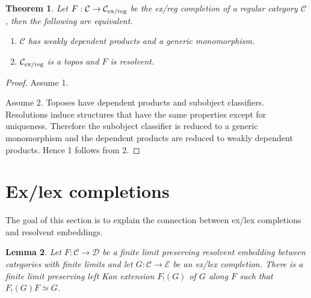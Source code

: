 \documentclass[sort&compress,draft]{elsarticle}
\theoremstyle{plain}
\newtheorem{theorem}{Theorem}
\newtheorem{lemma}[theorem]{Lemma}
\theoremstyle{definition}
\theoremstyle{remark}
\newcommand\hide[1]{}
\newcommand\cat\mathcal
\newcommand\of:
\newcommand\di{_!}
\begin{document}
\begin{theorem} Let $F:\cat C\to\cat C\exreg$ be the ex/reg completion of a regular category $\cat C$, then the following are equivalent.
\begin{enumerate}
\item $\cat C$ has \emph{weakly dependent products} and a \emph{generic monomorphism}. \hide{these need to be defined somewhere}
\item $\cat C\exreg$ is a topos and $F$ is resolvent. 
\end{enumerate}
\end{theorem}

\begin{proof}
Assume 1.

\hide{
The 'more direct proof' from the referee ignores resolvency of the regular completion, which is one of the two most important theorems of this paper. No wonder it can afford to be so simple. It must be an evil plot to bury this most remarkable result, possibly to claim it as his/her own at a later date.

Does the concept of a weakly complete equivalence relation make sense in regular categories?
Something extra that allows us to reduce any subobject of equivalent elements to a single element, possibly related to the generic monomorphisms?

Let $E(X,Y)\subseteq P(X)$ consist of equivalence classes, and look for the 'join operator' $\bigvee:E(X)\to X$.
}

Assume 2. Toposes have dependent products and subobject classifiers. Resolutions induce structures that have the same properties except for uniqueness. Therefore the subobject classifier is reduced to a generic monomorphism and the dependent products are reduced to weakly dependent products. Hence 1 follows from 2. %
\end{proof}

\hide{conclusion... }

\section{Ex/lex completions}
The goal of this section is to explain the connection between ex/lex completions and resolvent embeddings.

\begin{lemma} Let $F\of\cat C\to\cat D$ be a finite limit preserving resolvent embedding between categories with finite limits and let $G\of\cat C\to\cat E$ be an ex/lex completion. There is a finite limit preserving left Kan extension $F\di(G)$ of $G$ along $F$ such that $F\di(G)F\simeq G$.\label{lex ex}\end{lemma}
\end{document}
